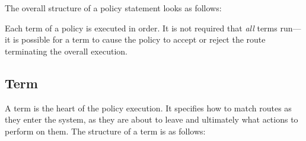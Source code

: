 The overall structure of a policy statement looks as follows:

\noindent{}

Each term of a policy is executed in order.  It is not required that {\em all}
terms run---it is possible for a term to cause the policy to accept or
reject the route terminating the overall execution.

\subsection{Term}
A term is the heart of the policy execution.  It specifies how to match routes
as they enter the system, as they are about to leave and ultimately what
actions to perform on them.  The structure of a term is as follows:

\noindent{}


